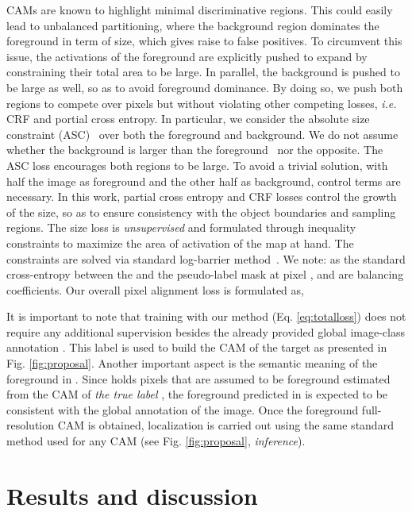 \documentclass[twocolumn]{article}
\makeatletter
\theoremstyle{definition}
\newcommand*{\ie}{\emph{i.e.}\@\xspace}
\makeatother
\begin{document}
CAMs are known to highlight minimal discriminative regions. This could easily lead to unbalanced partitioning, where the background region dominates the foreground in term of size, which gives raise to false positives. To circumvent this issue, the activations of the foreground are explicitly pushed to expand by constraining their total area to be large. In parallel, the background is pushed to be large as well, so as to avoid foreground dominance. By doing so, we push both regions to compete over pixels but without violating other competing losses, \ie CRF and portial cross entropy. In particular, we consider the absolute size constraint (ASC)~\cite{belharbi2020minmaxuncer} over both the foreground and background. We do not assume whether the background is larger than the foreground~\cite{pathak2015constrained} nor the opposite. The ASC loss encourages both regions to be large. To avoid a trivial solution, with half the image as foreground and the other half as background, control terms are necessary. In this work, partial cross entropy and CRF losses control the growth of the size, so as to ensure consistency with the object boundaries and sampling regions. The size loss is {\em unsupervised} and formulated through inequality constraints to maximize the area of activation of the map at hand. The constraints are solved via standard log-barrier method~\cite{boyd2004convex}.
We note:  as the standard cross-entropy between the  and the pseudo-label mask  at pixel , and  are balancing coefficients. Our overall pixel alignment loss is formulated as,


It is important to note that training with our method (Eq. \ref{eq:totalloss}) does not require any additional supervision besides the already provided global image-class annotation . This label is used to build the CAM of the target as presented in Fig. \ref{fig:proposal}. Another important aspect is the semantic meaning of the foreground in . Since  holds pixels that are assumed to be foreground estimated from the CAM  of \emph{the true label} , the foreground predicted in  is expected to be consistent with the global annotation  of the image. Once the foreground full-resolution CAM is obtained, localization is carried out using the same standard method used for any CAM (see Fig. \ref{fig:proposal}, \emph{inference}).


\section{Results and discussion}
\label{sec:experiments}
\end{document}
